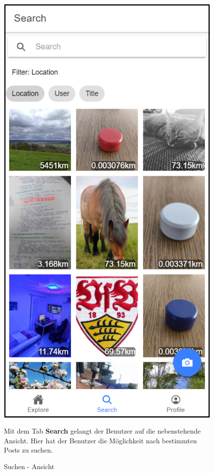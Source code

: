 \begin{figure}[H]
    \centering
    \begin{minipage}{.4\textwidth}
        \begin{center}
            \includegraphics[width=0.8\linewidth]{images/Search.png}
        \end{center}
        \caption{Suchen - Ansicht}
        \label{fig:searchTab}
    \end{minipage}%
    \begin{minipage}{.6\textwidth}
        \begin{changemargin}{0.5cm}{0cm}            
            Mit dem Tab \glqq \textbf{Search}\grqq{} gelangt der Benutzer auf die nebenstehende Ansicht. Hier hat der Benutzer die Möglichkeit nach bestimmten Posts zu suchen.


\end{changemargin}
\end{minipage}
\end{figure}
